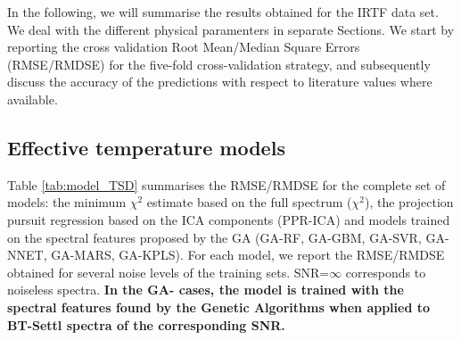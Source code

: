 
In the following, we will summarise the results obtained for the IRTF
data set. We deal with the different physical paramenters in separate
Sections. We start by reporting the cross validation Root Mean/Median
Square Errors (RMSE/RMDSE) for the five-fold cross-validation
strategy, and subsequently discuss the accuracy of the predictions
with respect to literature values where available.

\subsection{Effective temperature models}


Table \ref{tab:model_TSD} summarises the RMSE/RMDSE for the complete
set of models: the minimum $\chi^2$ estimate based on the full
spectrum ($\chi^2$), the projection pursuit regression based on the
ICA components (PPR-ICA) and models trained on the spectral features
proposed by the GA (GA-RF, GA-GBM, GA-SVR, GA-NNET, GA-MARS,
GA-KPLS). For each model, we report the RMSE/RMDSE obtained for
several noise levels of the training sets.  SNR=$\infty$ corresponds
to noiseless spectra. {\bf In the GA- cases, the model is trained with
  the spectral features found by the Genetic Algorithms when applied
  to BT-Settl spectra of the corresponding SNR.}

